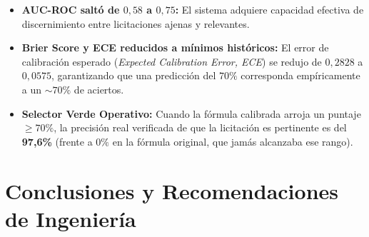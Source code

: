 \documentclass[11pt,a4paper]{article}
\begin{document}
\begin{table}[htbp]
\centering
\small
\caption{Métricas de Calibración Probabilística y Capacidad de Separación ($1.146$ pares).}
\label{tab:calibracion}
\end{table}

\begin{itemize}[leftmargin=*]
    \item \textbf{AUC-ROC saltó de $0{,}58$ a $0{,}75$:} El sistema adquiere capacidad efectiva de discernimiento entre licitaciones ajenas y relevantes.
    \item \textbf{Brier Score y ECE reducidos a mínimos históricos:} El error de calibración esperado (\textit{Expected Calibration Error, ECE}) se redujo de $0{,}2828$ a $0{,}0575$, garantizando que una predicción del $70\%$ corresponda empíricamente a un $\sim 70\%$ de aciertos.
    \item \textbf{Selector Verde Operativo:} Cuando la fórmula calibrada arroja un puntaje $\ge 70\%$, la precisión real verificada de que la licitación es pertinente es del \textbf{97{,}6\%} (frente a $0\%$ en la fórmula original, que jamás alcanzaba ese rango).
\end{itemize}

\section{Conclusiones y Recomendaciones de Ingeniería}
\end{document}
